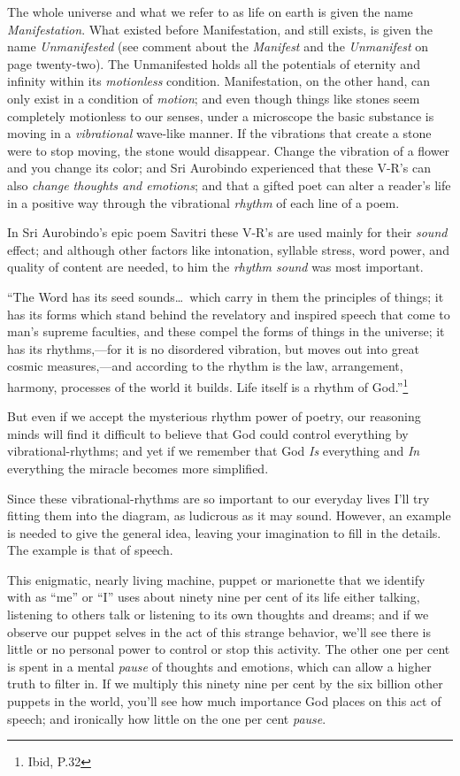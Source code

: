 \documentclass[12pt,a4paper]{book}
\begin{document}
The whole universe and what we refer to as life on earth is given the
name \emph{Manifestation}.  What existed before Manifestation, and
still exists, is given the name \emph{Unmanifested} (see comment about
the \emph{Manifest} and the \emph{Unmanifest} on page
twenty-two).  The Unmanifested holds all the potentials of
eternity and infinity within its \emph{motionless} condition.
Manifestation, on the other hand, can only exist in a condition of
\emph{motion}; and even though things like stones seem completely
motionless to our senses, under a microscope the basic substance is
moving in a \emph{vibrational} wave-like manner.  If the vibrations
that create a stone were to stop moving, the stone would disappear.
Change the vibration of a flower and you change its color; and Sri
Aurobindo experienced that these V-R's can also \emph{change thoughts
  and emotions}; and that a gifted poet can alter a reader's life in a
positive way through the vibrational \emph{rhythm} of each line of a
poem.

In Sri Aurobindo's epic poem Savitri these V-R's are used mainly for
their \emph{sound} effect; and although other factors like intonation,
syllable stress, word power, and quality of content are needed, to him
the \emph{rhythm sound} was most important.

``The Word has its seed sounds\ldots\ which carry in them the
principles of things; it has its forms which stand behind the
revelatory and inspired speech that come to man's supreme faculties,
and these compel the forms of things in the universe; it has its
rhythms,---for it is no disordered vibration, but moves out into great
cosmic measures,---and according to the rhythm is the law,
arrangement, harmony, processes of the world it builds. Life itself is
a rhythm of God.''\footnote{Ibid, P.32}


But even if we accept the mysterious rhythm power of poetry, our
reasoning minds will find it difficult to believe that God could
control everything by vibrational-rhythms; and yet if we remember that
God \emph{Is} everything and \emph{In} everything the miracle becomes
more simplified.

Since these vibrational-rhythms are so important to our everyday lives
I'll try fitting them into the diagram, as ludicrous as it may
sound. However, an example is needed to give the general idea, leaving
your imagination to fill in the details. The example is that of
speech.

This enigmatic, nearly living machine, puppet or marionette that we
identify with as ``me'' or ``I'' uses about ninety nine per cent of
its life either talking, listening to others talk or listening to its
own thoughts and dreams; and if we observe our puppet selves in the
act of this strange behavior, we'll see there is little or no personal
power to control or stop this activity. The other one per cent is
spent in a mental \emph{pause} of thoughts and emotions, which can
allow a higher truth to filter in. If we multiply this ninety nine per
cent by the six billion other puppets in the world, you'll see how
much importance God places on this act of speech; and ironically how
little on the one per cent \emph{pause}.
\end{document}
